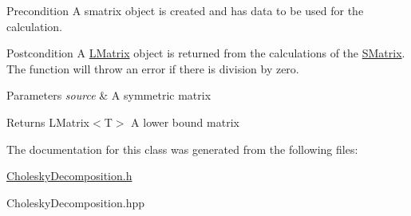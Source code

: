 \begin{DoxyPrecond}{Precondition}
A smatrix object is created and has data to be used for the calculation. 
\end{DoxyPrecond}
\begin{DoxyPostcond}{Postcondition}
A \mbox{\hyperlink{class_l_matrix}{L\+Matrix}} object is returned from the calculations of the \mbox{\hyperlink{class_s_matrix}{S\+Matrix}}. The function will throw an error if there is division by zero.
\end{DoxyPostcond}

\begin{DoxyParams}{Parameters}
{\em source} & A symmetric matrix \\
\hline
\end{DoxyParams}
\begin{DoxyReturn}{Returns}
L\+Matrix$<$\+T$>$ A lower bound matrix 
\end{DoxyReturn}


The documentation for this class was generated from the following files\+:\begin{DoxyCompactItemize}
\item 
\mbox{\hyperlink{_cholesky_decomposition_8h}{Cholesky\+Decomposition.\+h}}\item 
Cholesky\+Decomposition.\+hpp\end{DoxyCompactItemize}
